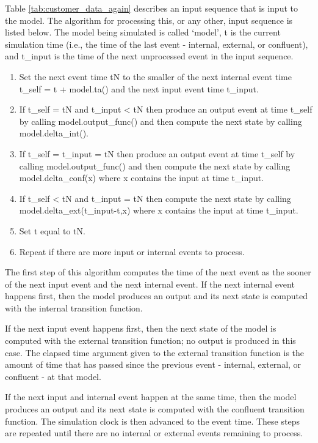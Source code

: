 Table \ref{tab:customer_data_again} describes an input sequence that is input to the  model. The algorithm for processing this, or any other, input sequence is listed below. The  model being simulated is called `model', t is the current simulation time (i.e., the time of the last event - internal, external, or confluent), and t\_input is the time of the next unprocessed event in the input sequence.
\begin{enumerate}
\item Set the next event time tN to the smaller of the next internal event time t\_self = t + model.ta() and the next input event time t\_input.
\item If t\_self = tN and t\_input < tN then produce an output event at time t\_self by calling model.output\_func() and then compute the next state by calling model.delta\_int().
\item If t\_self = t\_input = tN then produce an output event at time t\_self by calling model.output\_func() and then compute the next state by calling model.delta\_conf(x) where x contains the input at time t\_input.
\item If t\_self < tN and t\_input = tN then compute the next state by calling model.delta\_ext(t\_input-t,x) where x contains the input at time t\_input.
\item Set t equal to tN.
\item Repeat if there are more input or internal events to process.
\end{enumerate}

The first step of this algorithm computes the time of the next event as the sooner of the next input event and the next internal event. If the next internal event happens first, then the model produces an output and its next state is computed with the internal transition function.

If the next input event happens first, then the next state of the model is computed with the external transition function; no output is produced in this case. The elapsed time argument given to the external transition function is the amount of time that has passed since the previous event - internal, external, or confluent - at that model.

If the next input and internal event happen at the same time, then the model produces an output and its next state is computed with the confluent transition function. The simulation clock is then advanced to the event time. These steps are repeated until there are no internal or external events remaining to process.

